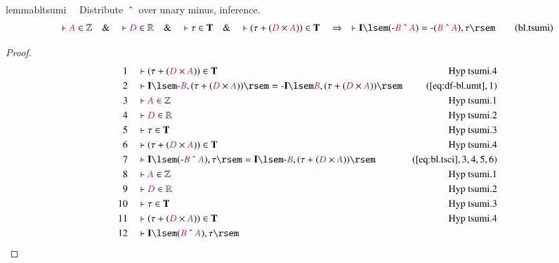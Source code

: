 \begin{restatable}{lemma}{bltsumi}~~ Distribute $~\string^~$ over unary minus,
inference.
\begin{align}
\vdash \mc{A} \in \mathbb{Z}\quad\&\quad \vdash \mc{D} \in
    \mathbb{R}\quad\&\quad \vdash \tau \in \mathbf{T}\quad\&\quad \vdash ( \tau
    + ( \mc{D} \times \mc{A} ) ) \in \mathbf{T}\quad\Rightarrow\quad \vdash
    \mathbf{I} \lsem ( \textrm{-} \mc{B} ~\string^~ \mc{A} ) = \textrm{-} (
    \mc{B} ~\string^~ \mc{A} ) , \tau \rsem\label{eq:bl.tsumi}\tag{bl.tsumi}
\end{align}
\end{restatable}

\begin{proof}
\begin{align}
  1 &&  & \vdash ( \tau + ( \mc{D} \times \mc{A} ) ) \in
      \mathbf{T}&\text{Hyp~tsumi.4}\notag%
  \\ 2 &&  & \vdash \mathbf{I} \lsem \textrm{-} \mc{B} , ( \tau + ( \mc{D}
      \times \mc{A} ) ) \rsem = \textrm{-} \mathbf{I} \lsem
      \mc{B} , ( \tau + ( \mc{D} \times \mc{A} ) )
      \rsem&(\mbox{\ref{eq:df-bl.umt}},1)\notag
  \\ 3 &&  & \vdash \mc{A} \in \mathbb{Z}&\text{Hyp~tsumi.1}\notag%
  \\ 4 &&  & \vdash \mc{D} \in \mathbb{R}&\text{Hyp~tsumi.2}\notag%
  \\ 5 &&  & \vdash \tau \in \mathbf{T}&\text{Hyp~tsumi.3}\notag%
  \\ 6 &&  & \vdash ( \tau + ( \mc{D} \times \mc{A} ) ) \in
      \mathbf{T}&\text{Hyp~tsumi.4}\notag%
  \\ 7 &&  & \vdash \mathbf{I} \lsem ( \textrm{-} \mc{B} ~\string^~ \mc{A} ) ,
      \tau \rsem = \mathbf{I} \lsem \textrm{-} \mc{B} , (
      \tau + ( \mc{D} \times \mc{A} ) )
      \rsem&(\mbox{\ref{eq:bl.tsci}},3,4,5,6)\notag
  \\ 8 &&  & \vdash \mc{A} \in \mathbb{Z}&\text{Hyp~tsumi.1}\notag%
  \\ 9 &&  & \vdash \mc{D} \in \mathbb{R}&\text{Hyp~tsumi.2}\notag%
  \\ 10 &&  & \vdash \tau \in \mathbf{T}&\text{Hyp~tsumi.3}\notag%
  \\ 11 &&  & \vdash ( \tau + ( \mc{D} \times \mc{A} ) ) \in
      \mathbf{T}&\text{Hyp~tsumi.4}\notag%
  \\ 12 &&  & \vdash \mathbf{I} \lsem ( \mc{B} ~\string^~ \mc{A} ) , \tau \rsem

\end{align}
\end{proof}
